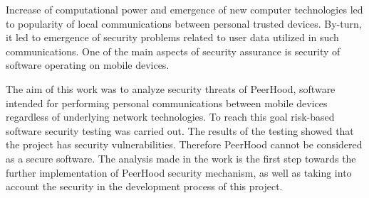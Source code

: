 %
Increase of computational power and emergence of new computer technologies led to popularity of local communications between personal trusted devices. 
%
By-turn, it led to emergence of security problems related to user data utilized in such communications. 
%
One of the main aspects of  security assurance is security of software operating on mobile devices. 

%
The aim of this work was to analyze security threats of PeerHood, software intended for performing personal communications between mobile devices regardless of underlying network technologies. 
%
To reach this goal risk-based software security testing was carried out. 
%
The results of the testing showed that the project has security vulnerabilities. 
%
Therefore PeerHood cannot be considered as a secure software. 
%
The analysis made in the work is the first step towards the further implementation of PeerHood security mechanism, as well as taking into account the security in the development process of this project. 